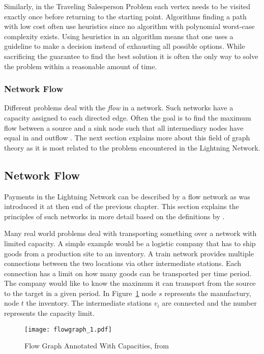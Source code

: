 \documentclass[final]{fhnwreport}       %
\begin{document}
Similarly, in the Traveling Salesperson Problem each vertex needs to be visited exactly once before returning to the starting point. Algorithms finding a path with low cost often use heuristics since no algorithm with polynomial worst-case complexity exists. Using heuristics in an algorithm means that one uses a guideline to make a decision instead of exhausting all possible options. While sacrificing the guarantee to find the best solution it is often the only way to solve the problem within a reasonable amount of time.

\subsubsection{Network Flow}
Different problems deal with the \emph{flow} in a network. Such networks have a capacity assigned to each directed edge. Often the goal is to find the maximum flow between a source and a sink node such that all intermediary nodes have equal in and outflow \citep{even_network_1975}. The next section explains more about this field of graph theory as it is most related to the problem encountered in the Lightning Network.

\subsection{Network Flow}\label{subsec:flow}
Payments in the Lightning Network can be described by a flow network as was introduced it at then end of the previous chapter. This section explains the principles of such networks in more detail based on the definitions by \cite{wilson_introduction_2010}.

Many real world problems deal with transporting something over a network with limited capacity. A simple example would be a logistic company that has to ship goods from a production site to an inventory. A train network provides multiple connections between the two locations via other intermediate stations. Each connection has a limit on how many goods can be transported per time period. The company would like to know the maximum it can transport from the source to the target in a given period. In Figure~\ref{fig:flow_graph} node $s$ represents the manufactury, node $t$ the inventory. The intermediate stations $v_i$ are connected and the number represents the capacity limit.

\begin{figure}[H]
\centering
\texttt{[image: flowgraph\_1.pdf]}
\caption{Flow Graph Annotated With Capacities, from \cite{brossard_graph_2010}}
\label{fig:flow_graph}
\end{figure}
\end{document}
